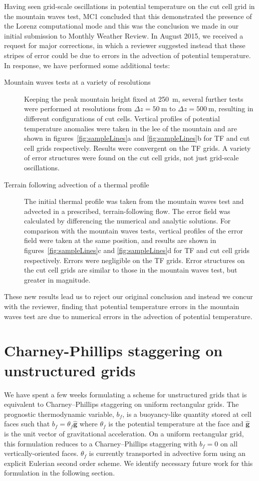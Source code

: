 \documentclass[a4paper]{article}
\begin{document}
Having seen grid-scale oscillations in potential temperature on the cut cell grid in the mountain waves test, MC1 concluded that this demonstrated the presence of the Lorenz computational mode and this was the conclusion we made in our initial submission to Monthly Weather Review.  In August 2015, we received a request for major corrections, in which a reviewer suggested instead that these stripes of error could be due to errors in the advection of potential temperature.
In response, we have performed some additional tests:
\begin{description}
	\item[Mountain waves tests at a variety of resolutions]{Keeping the peak mountain height fixed at \SI{250}{\meter}, several further tests were performed at resolutions from $\Delta z = \SI{50}{\meter}$ to $\Delta z = \SI{500}{\meter}$, resulting in different configurations of cut cells.  Vertical profiles of potential temperature anomalies were taken in the lee of the mountain and are shown in figures~\ref{fig:sampleLines}a and \ref{fig:sampleLines}b for TF and cut cell grids respectively.  Results were convergent on the TF grids.  A variety of error structures were found on the cut cell grids, not just grid-scale oscillations.}
	\item[Terrain following advection of a thermal profile]{The initial thermal profile was taken from the mountain waves test and advected in a prescribed, terrain-following flow.  The error field was calculated by differencing the numerical and analytic solutions.  For comparison with the mountain waves tests, vertical profiles of the error field were taken at the same position, and results are shown in figures~\ref{fig:sampleLines}c and \ref{fig:sampleLines}d for TF and cut cell grids respectively.  Errors were negligible on the TF grids.  Error structures on the cut cell grids are similar to those in the mountain waves test, but greater in magnitude.}
\end{description}
These new results lead us to reject our original conclusion and instead we concur with the reviewer, finding that potential temperature errors in the mountain waves test are due to numerical errors in the advection of potential temperature.

\section{Charney-Phillips staggering on unstructured grids}
\label{sec:cp}
We have spent a few weeks formulating a scheme for unstructured grids that is equivalent to Charney--Phillips staggering on uniform rectangular grids.  The prognostic thermodynamic variable, $b_f$, is a buoyancy-like quantity stored at cell faces such that $b_f = \theta_f \bm{\hat{g}}$ where $\theta_f$ is the potential temperature at the face and $\bm{\hat{g}}$ is the unit vector of gravitational acceleration.  On a uniform rectangular grid, this formulation reduces to a Charney--Phillips staggering with $b_f = 0$ on all vertically-oriented faces.  $\theta_f$ is currently transported in advective form using an explicit Eulerian second order scheme.  We identify necessary future work for this formulation in the following section.
\end{document}
